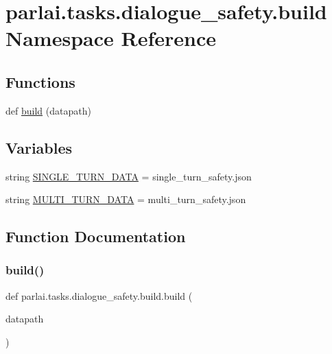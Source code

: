 \hypertarget{namespaceparlai_1_1tasks_1_1dialogue__safety_1_1build}{}\section{parlai.\+tasks.\+dialogue\+\_\+safety.\+build Namespace Reference}
\label{namespaceparlai_1_1tasks_1_1dialogue__safety_1_1build}
\subsection*{Functions}
\begin{DoxyCompactItemize}
\item 
def \hyperlink{namespaceparlai_1_1tasks_1_1dialogue__safety_1_1build_a455bdcaa83ad5436bff9da4dcf869412}{build} (datapath)
\end{DoxyCompactItemize}
\subsection*{Variables}
\begin{DoxyCompactItemize}
\item 
string \hyperlink{namespaceparlai_1_1tasks_1_1dialogue__safety_1_1build_a656e397b5397797c12959988e086ef76}{S\+I\+N\+G\+L\+E\+\_\+\+T\+U\+R\+N\+\_\+\+D\+A\+TA} = \textquotesingle{}single\+\_\+turn\+\_\+safety.\+json\textquotesingle{}
\item 
string \hyperlink{namespaceparlai_1_1tasks_1_1dialogue__safety_1_1build_acc5addd8c4f2ab28d80d440b30716fdc}{M\+U\+L\+T\+I\+\_\+\+T\+U\+R\+N\+\_\+\+D\+A\+TA} = \textquotesingle{}multi\+\_\+turn\+\_\+safety.\+json\textquotesingle{}
\end{DoxyCompactItemize}


\subsection{Function Documentation}
\mbox{\label{namespaceparlai_1_1tasks_1_1dialogue__safety_1_1build_a455bdcaa83ad5436bff9da4dcf869412}} 
\subsubsection{\texorpdfstring{build()}{build()}}
{\footnotesize\ttfamily def parlai.\+tasks.\+dialogue\+\_\+safety.\+build.\+build (\begin{DoxyParamCaption}\item[{}]{datapath }\end{DoxyParamCaption})}




